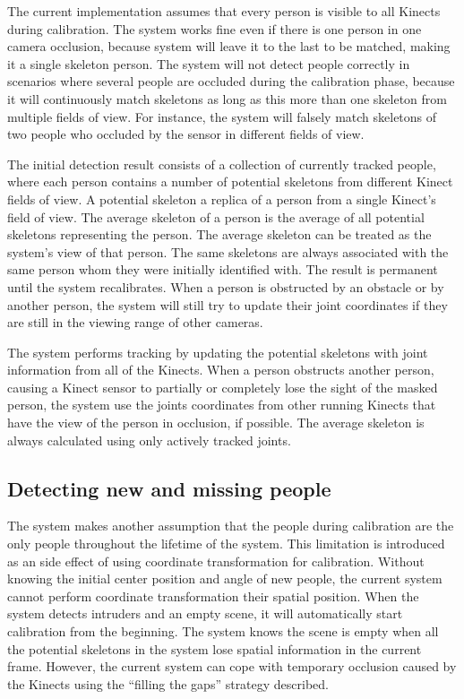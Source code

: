 The current implementation assumes that every person is visible to all Kinects during calibration. The system works fine even if there is one person in one camera occlusion, because system will leave it to the last to be matched, making it a single skeleton person. The system will not detect people correctly in scenarios where several people are occluded during the calibration phase, because it will continuously match skeletons as long as this more than one skeleton from multiple fields of view. For instance, the system will falsely match skeletons of two people who occluded
by the sensor in different fields of view.

The initial detection result consists of a collection of currently tracked people, where each person contains a number of potential skeletons from different Kinect fields of view. A potential skeleton a replica of a person from a single Kinect's field of view. The average skeleton of a person is the average of all potential skeletons representing the person. The average skeleton can be treated as the system's view of that person. The same skeletons are always associated with the same person whom they were initially identified with. The result is permanent until the system recalibrates. When a person is obstructed by an obstacle or by another person, the system will still try to update their joint coordinates if they are still in the viewing range of other cameras.

The system performs tracking by updating the potential skeletons with joint information from all of the Kinects. When a person obstructs another person, causing a Kinect sensor to partially or completely lose the sight of the masked person, the system use the joints coordinates from other running Kinects that have the view of the person in occlusion, if possible. The average skeleton is always calculated using only actively tracked joints.

\subsection{Detecting new and missing people}

The system makes another assumption that the people during calibration are the only people throughout the lifetime of the system. This limitation is introduced as an side effect of using coordinate transformation for calibration. Without knowing the initial center position and angle of new people, the current system cannot perform coordinate transformation their spatial position. When the system detects intruders and an empty scene, it will automatically start calibration from the beginning. The system knows the scene is empty when all the potential skeletons in the system lose spatial information in the current frame. However, the current system can cope with temporary occlusion caused by the Kinects using the ``filling the gaps'' strategy described.


